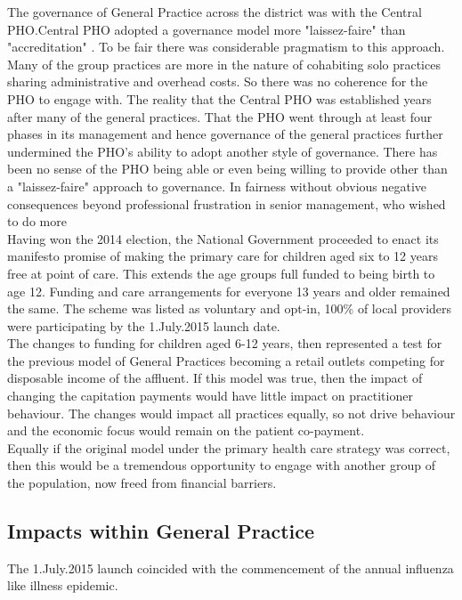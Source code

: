 \documentclass[11pt,a4paper]{article}
\begin{document}
The governance of General Practice across the district was with the Central PHO.Central PHO adopted a governance model more "laissez-faire" than "accreditation" \citep{greenwood2007european}. To be fair there was considerable pragmatism to this approach. Many of the group practices are more in the nature of cohabiting solo practices sharing administrative and overhead costs. So there was no coherence for the PHO to engage with. The reality that the Central PHO was established years after many of the general practices. That the PHO went through at least four phases in its management and hence governance of the general practices further undermined the PHO's ability to adopt another style of governance. There has been no sense of the PHO being able or even being willing to provide other than a "laissez-faire" approach to governance. In fairness without obvious negative consequences beyond professional frustration in senior management, who wished to do more\\

Having won the 2014 election, the National Government proceeded to enact its manifesto promise of making the primary care for children aged six to 12 years free at point of care. This extends the age groups full funded to being birth to age 12. Funding and care arrangements for everyone 13 years and older remained the same. The scheme was listed as voluntary and opt-in, 100\% of local providers were participating by the 1.July.2015 launch date.\\

The changes to funding for children aged 6-12 years, then represented a test for the previous model of General Practices becoming a retail outlets competing for disposable income of the affluent. If this model was true, then the impact of changing the capitation payments would have little impact on practitioner behaviour. The changes would impact all practices equally, so not drive behaviour and the economic focus would remain on the patient co-payment.\\

Equally if the original model under the primary health care strategy was correct, then this would be a tremendous opportunity to engage with another group of the population, now freed from financial barriers.\\ 

\subsection{Impacts within General Practice}
The 1.July.2015 launch coincided with the commencement of the annual influenza like illness epidemic. \\
\end{document}
